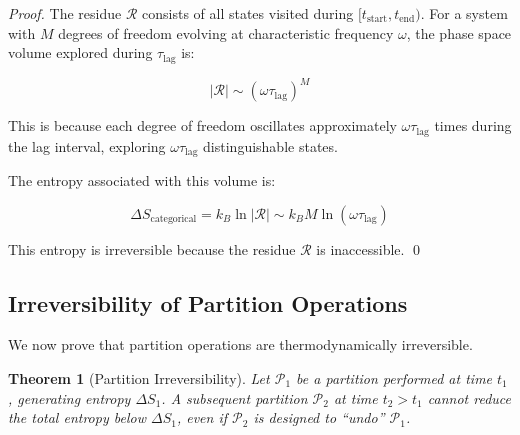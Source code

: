 \documentclass[twocolumn,10pt]{article}
\newtheorem{theorem}{Theorem}[section]
\theoremstyle{definition}
\theoremstyle{remark}
\begin{document}
\begin{proof}
The residue $\mathcal{R}$ consists of all states visited during $[t_{\text{start}}, t_{\text{end}})$. For a system with $M$ degrees of freedom evolving at characteristic frequency $\omega$, the phase space volume explored during $\tau_{\text{lag}}$ is:

$$
|\mathcal{R}| \sim (\omega \tau_{\text{lag}})^M
$$

This is because each degree of freedom oscillates approximately $\omega \tau_{\text{lag}}$ times during the lag interval, exploring $\omega \tau_{\text{lag}}$ distinguishable states.

The entropy associated with this volume is:

$$
\Delta S_{\text{categorical}} = k_B \ln |\mathcal{R}| \sim k_B M \ln(\omega \tau_{\text{lag}})
$$

This entropy is irreversible because the residue $\mathcal{R}$ is inaccessible. \qed
\end{proof}

\subsection{Irreversibility of Partition Operations}

We now prove that partition operations are thermodynamically irreversible.

\begin{theorem}[Partition Irreversibility]
Let $\mathcal{P}_1$ be a partition performed at time $t_1$, generating entropy $\Delta S_1$. A subsequent partition $\mathcal{P}_2$ at time $t_2 > t_1$ cannot reduce the total entropy below $\Delta S_1$, even if $\mathcal{P}_2$ is designed to ``undo'' $\mathcal{P}_1$.
\end{theorem}
\end{document}
